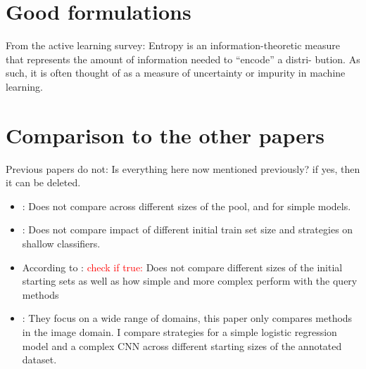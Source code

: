 \documentclass{article}
\theoremstyle{plain}
\theoremstyle{definition}
\theoremstyle{remark}
\begin{document}
\section{Good formulations}
From the active learning survey: Entropy is an information-theoretic
measure that represents the amount of information needed to “encode” a distri-
bution. As such, it is often thought of as a measure of uncertainty or impurity in machine learning.

\section{Comparison to the other papers}
Previous papers do not: Is everything here now mentioned previously? if yes, then it can be deleted.
\begin{itemize}
	\item \cite{schröder_revisitinguncertaintybasedquerystrategies}: Does not compare across different sizes of the pool, and for simple models.
	\item \cite{comparativesurveydeepactive}: Does not compare impact of different initial train set size and strategies on shallow classifiers.
	
	\item According to \cite{ueno_benchmarkingofquerystrategies}: \textcolor{red}{check if true:} Does not compare different sizes of the initial starting sets as well as how simple and more complex perform with the query methods
	
	\item \cite{werner_comparableactivelearning}: They focus on a wide range of domains, this paper only compares methods in the image domain. I compare strategies for a simple logistic regression model and a complex CNN across different starting sizes of the annotated dataset. \\
\end{itemize}



\end{document}
